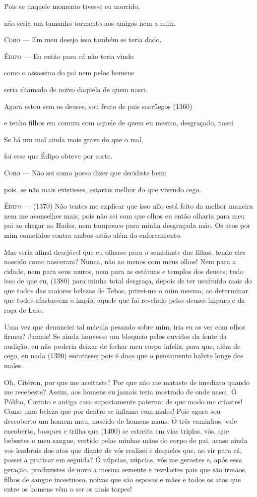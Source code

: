Pois se naquele momento tivesse eu morrido,

não seria um tamanho tormento aos amigos nem a mim.

\textsc{Coro} --- Em meu desejo isso também se teria dado.

\textsc{Édipo} --- Eu então para cá não teria vindo

como o assassino do pai nem pelos homens

seria chamado de noivo daquela de quem nasci.

Agora estou sem os deuses, sou fruto de pais sacrílegos (1360)

e tenho filhos em comum com aquele de quem eu mesmo, desgraçado, nasci.

Se há um mal ainda mais grave do que o mal,

foi esse que Édipo obteve por sorte.

\textsc{Coro} --- Não sei como posso dizer que decidiste bem;

pois, se não mais existisses, estarias melhor do que vivendo cego.

\textsc{Édipo} --- (1370) Não tentes me explicar que isso não está feito da melhor maneira
nem me aconselhes mais, pois não sei com que olhos eu então olharia para
meu pai ao chegar ao Hades, nem tampouco para minha desgraçada mãe. Os
atos por mim cometidos contra ambos estão além do enforcamento.

Mas seria afinal desejável que eu olhasse para o semblante dos filhos,
tendo eles nascido como nasceram? Nunca, não ao menos com meus olhos!
Nem para a cidade, nem para seus muros, nem para as estátuas e templos
dos deuses; tudo isso de que eu, (1380) para minha total desgraça,
depois de ter usufruído mais do que todos das maiores belezas de Tebas,
privei-me a mim mesmo, ao determinar que todos afastassem o ímpio,
aquele que foi revelado pelos deuses impuro e da raça de Laio.

Uma vez que denunciei tal mácula pesando sobre mim, iria eu os ver com
olhos firmes? Jamais! Se ainda houvesse um bloqueio pelos ouvidos da
fonte da audição, eu não poderia deixar de fechar meu corpo infeliz,
para que, além de cego, eu nada (1390) escutasse; pois é doce que o
pensamento habite longe dos males.

Oh, Citéron, por que me aceitaste? Por que não me mataste de imediato
quando me recebeste? Assim, aos homens eu jamais teria mostrado de onde
nasci. Ó Pólibo, Corinto e antiga casa supostamente paterna: de que modo
me criastes! Como uma beleza que por dentro se inflama com males! Pois
agora sou descoberto um homem mau, nascido de homens maus. Ó três
caminhos, vale encoberto, bosques e trilha que (1400) se estreita em
vias triplas, vós, que bebestes o meu sangue, vertido pelas minhas mãos
do corpo do pai, acaso ainda vos lembrais dos atos que diante de vós
realizei e daqueles que, ao vir para cá, passei a praticar em seguida? Ó
núpcias, núpcias, vós me gerastes e, após essa geração, produzistes de
novo a mesma semente e revelastes pais que são irmãos, filhos de sangue
incestuoso, noivas que são esposas e mães e todos os atos que entre os
homens vêm a ser os mais torpes!


